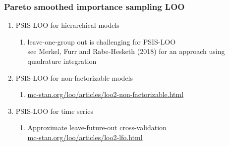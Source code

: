 \documentclass[10pt]{beamer}
\begin{document}
\begin{frame}{}

\frametitle{ Pareto smoothed importance sampling LOO}

\begin{enumerate}
\item PSIS-LOO for hierarchical models
  \begin{enumerate}
  \item leave-one-group out is challenging for PSIS-LOO\\ \vspace{0.2\baselineskip}
    {\small see Merkel, Furr and Rabe-Hesketh
      (2018) for an approach using quadrature integration}
  \end{enumerate}
  \item<2-> PSIS-LOO for non-factorizable models
    \begin{enumerate}
    \item {\url{mc-stan.org/loo/articles/loo2-non-factorizable.html}}
    \end{enumerate}
  \item<3-> PSIS-LOO for time series
  \begin{enumerate}
  \item Approximate leave-future-out cross-validation \\ \vspace{0.2\baselineskip}
    {\url{mc-stan.org/loo/articles/loo2-lfo.html}}
  \end{enumerate}
\end{enumerate}

\end{frame}
\end{document}
